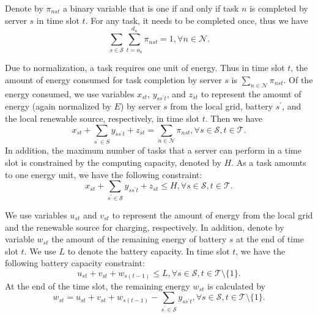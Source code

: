 \documentclass[conference, 10pt, ﬁnal, letterpaper, twocolumn]{IEEEtran}
\begin{document}
Denote by $\pi_{nst}$ a binary variable that is one if and only if task $n$ is completed by server $s$ in time slot $t$. For any task, it needs to be completed once, thus we have
\begin{equation}\label{c0}
    \sum_{s \in \mathcal{S}} \sum^{d_n}_{t = o_n} \pi_{nst} = 1, \forall n \in \mathcal{N}.
\end{equation}

Due to normalization, a task requires one unit of energy. Thus in time slot $t$, the amount of energy consumed for task completion by server $s$ is $\sum_{n \in \mathcal{N}} \pi_{nst}$. Of the energy consumed, we use variables $x_{st}$, $y_{ss^\prime t}$, and $z_{st}$ to represent the amount of energy (again normalized by $E$) by server $s$ from the local grid, battery $s^\prime$, and the local renewable source, respectively, in time slot $t$. Then we have
\begin{equation}\label{c1}
     x_{st} + \sum_{s^\prime \in S}  y _{ss^\prime t} + z_{st} = \sum_{n \in \mathcal{N}} \pi_{nst}, \forall s \in \mathcal{S}, t \in \mathcal{T}.
\end{equation}
In addition, the maximum number of tasks that a server can perform in a time slot is constrained by the computing capacity, denoted by $H$. As a task amounts to one energy unit, we have the following constraint:
\begin{equation}\label{c4}
    x_{st}+\sum_{s^\prime \in\mathcal{S}} y_{ss^\prime t} +z_{st} \leq H, \forall s \in \mathcal{S}, t \in \mathcal{T}.
\end{equation}

We use variables $u_{st}$ and $v_{st}$ to represent the amount of energy from the local grid and the renewable source for charging, respectively. In addition, denote by variable $w_{st}$ the amount of the remaining energy of battery $s$ at the end of time slot $t$. We use $L$ to denote the battery capacity. In time slot $t$, we have the following battery capacity constraint:
\begin{equation}\label{c2}
    u_{st} + v_{st} + w_{s(t-1)} \leq L, \forall s \in \mathcal{S}, t \in \mathcal{T} \setminus \{1\}.
\end{equation}
At the end of the time slot, the remaining energy $w_{st}$ is calculated by
\begin{equation}\label{c3}
    w_{st} = u_{st} + v_{st} + w_{s(t-1)} -\sum_{s^\prime \in \mathcal{S}} y_{ss^\prime t}, \forall s \in \mathcal{S}, t \in \mathcal{T} \setminus \{1\}.
\end{equation}
\end{document}
